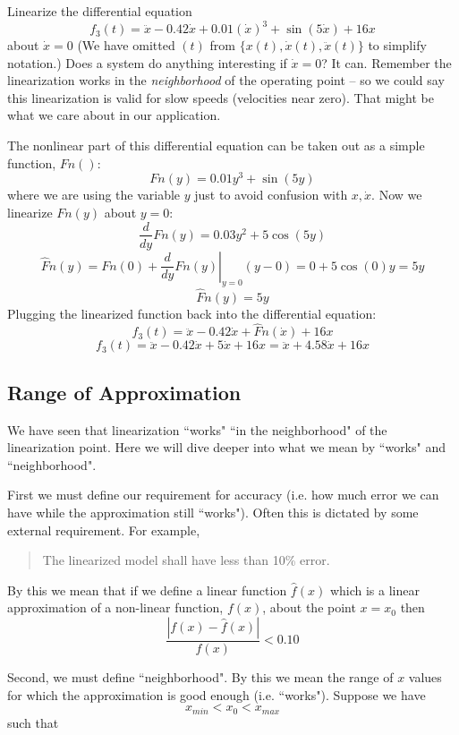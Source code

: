 \newpage\begin{ExampleSmall}
Linearize the differential equation
\[
f_3(t) =   \ddot{x} - 0.42\dot{x} + 0.01(\dot{x})^3 + \sin(5\dot{x}) + 16x
\]
about $\dot{x} = 0$  (We have omitted $(t)$ from $\{x(t), \dot{x}(t),\ddot{x}(t)\}$ to simplify notation.)
Does a system do anything interesting if $\dot{x} = 0$?  It can.  Remember the linearization works
in the {\it neighborhood} of the operating point -- so we could say this linearization is valid for slow speeds 
(velocities near zero).  That might be what we care about in our application.


\vspace{0.2in}
The nonlinear part of this differential equation can be taken out as a simple function, $Fn()$: 
\[
Fn(y) = 0.01y^3+\sin(5y)
\]
where we are using the variable $y$ just to avoid confusion with $x,\dot{x}$.   Now we linearize $Fn(y)$ about $y=0$:
\[
\frac{d} {dy}Fn(y)  = 0.03y^2+5\cos(5y)
\]
\[
\hat{F}n(y) = Fn(0) + \left . \frac{d} {dy}Fn(y) \right|_{y=0} (y-0) = 0 + 5\cos(0)y = 5y
\]\[
\hat{F}n(y) = 5y
\]
Plugging the linearized function back into the differential equation:
\[
f_3(t) =   \ddot{x} - 0.42\dot{x} + \hat{F}n(\dot{x}) + 16x
\]
\[
f_3(t) =   \ddot{x} - 0.42\dot{x} + 5\dot{x} + 16x = \ddot{x} + 4.58\dot{x} + 16x
\]
\end{ExampleSmall}


\subsection{Range of Approximation}
We have seen that linearization ``works" ``in the neighborhood" of the linearization point.   Here we will dive deeper into what
we mean by ``works" and ``neighborhood".

First we must define our requirement for accuracy (i.e. how much error we can have while the approximation still ``works").  
Often this is dictated by some external requirement.  For example, 
\begin{quotation}
The linearized model shall have less than 10\% error. 
\end{quotation}
By this we mean that if we define a linear function $\hat{f}(x)$ which is a linear approximation of a non-linear function, 
$f(x)$, about the point $x = x_0$ then 
\[
\frac   {|f(x)-\hat{f}(x)| } {f(x)} < 0.10
\]

Second, we must define ``neighborhood".    By this we mean the range of $x$ values for which the approximation is good enough (i.e. ``works").   Suppose we have 
\[
x_{min} < x_0 < x_{max}
\]
such that 

